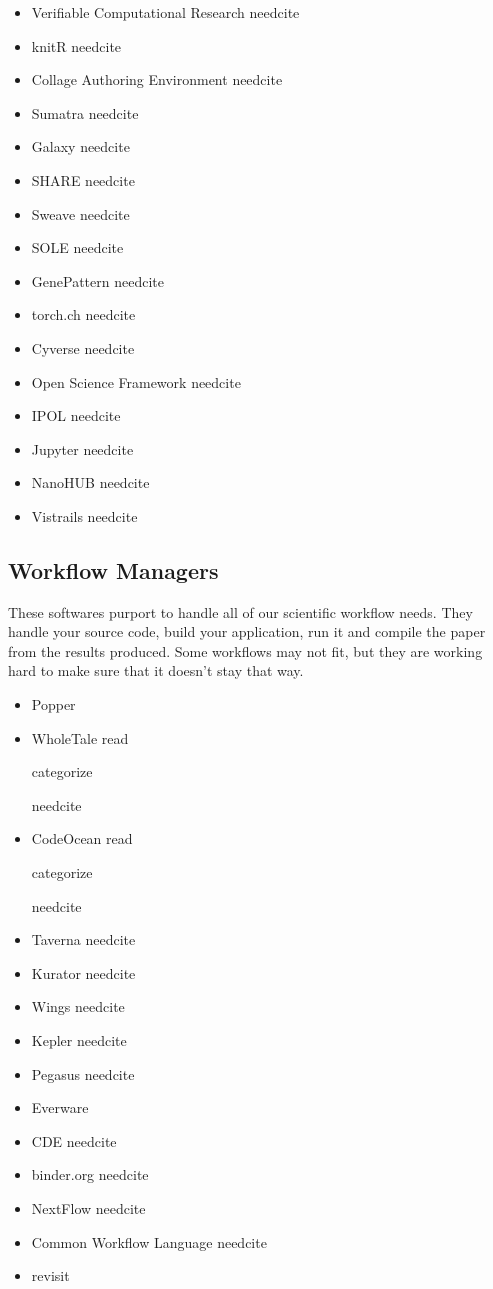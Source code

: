 \documentclass[american]{article}
\newcommand{\Read}{
	\gls{read}
}
\newcommand{\categorize}{
	\gls{categorize}
}
\newcommand{\needcite}{
	\gls{needcite}
}
\begin{document}
\begin{itemize}
\item Verifiable Computational Research \needcite
\item knitR \needcite
\item Collage Authoring Environment \needcite
\item Sumatra \needcite
\item Galaxy \needcite
\item SHARE \needcite
\item Sweave \needcite
\item SOLE \needcite
\item GenePattern \needcite
\item torch.ch \needcite
\item Cyverse \needcite
\item Open Science Framework \needcite
\item IPOL \needcite
\item Jupyter \needcite
\item NanoHUB \needcite
\item Vistrails \needcite
\end{itemize}

\subsection{Workflow Managers} \label{sec:software-managers}

These softwares purport to handle all of our scientific workflow needs. They handle your source code, build your application, run it and compile the paper from the results produced. Some workflows may not fit, but they are working hard to make sure that it doesn't stay that way.

\begin{itemize}
\item Popper \cite{popper}
\item WholeTale \Read \categorize \needcite
\item CodeOcean \Read \categorize \needcite
\item Taverna \needcite
\item Kurator \needcite
\item Wings \needcite
\item Kepler \needcite
\item Pegasus \needcite
\item Everware \cite{everware}
\item CDE \needcite
\item binder.org \needcite
\item NextFlow \needcite
\item Common Workflow Language \needcite
\item revisit \cite{matloff-revisit-2017}
\end{itemize}
\end{document}
